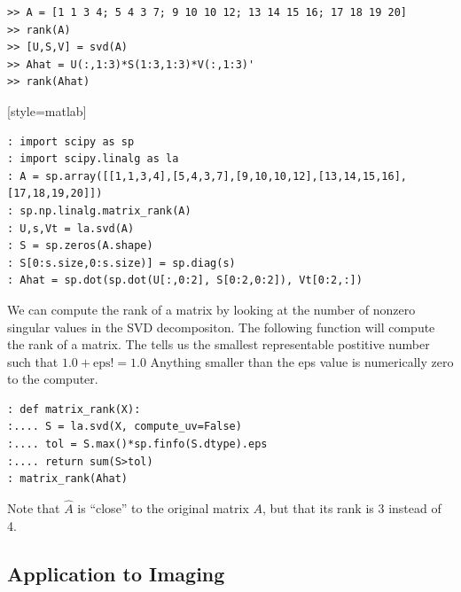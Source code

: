 \begin{matlab}
 \begin{lstlisting}[style=matlab]
>> A = [1 1 3 4; 5 4 3 7; 9 10 10 12; 13 14 15 16; 17 18 19 20]
>> rank(A)
>> [U,S,V] = svd(A)
>> Ahat = U(:,1:3)*S(1:3,1:3)*V(:,1:3)'
>> rank(Ahat)
\end{lstlisting}[style=matlab]
\end{matlab}
\begin{python}
\begin{lstlisting}[style=python]
: import scipy as sp
: import scipy.linalg as la
: A = sp.array([[1,1,3,4],[5,4,3,7],[9,10,10,12],[13,14,15,16],[17,18,19,20]])
: sp.np.linalg.matrix_rank(A)
: U,s,Vt = la.svd(A)
: S = sp.zeros(A.shape)
: S[0:s.size,0:s.size)] = sp.diag(s)
: Ahat = sp.dot(sp.dot(U[:,0:2], S[0:2,0:2]), Vt[0:2,:])
\end{lstlisting}

We can compute the rank of a matrix by looking at the number of nonzero singular values in the SVD decompositon.  The following function will compute the rank of a matrix.  The  tells us the smallest representable postitive number such that $1.0+\mbox{eps} != 1.0$  Anything smaller than the eps value is numerically zero to the computer.
\begin{lstlisting}[style=python]
: def matrix_rank(X):
:.... S = la.svd(X, compute_uv=False)
:.... tol = S.max()*sp.finfo(S.dtype).eps
:.... return sum(S>tol)
: matrix_rank(Ahat)
\end{lstlisting}
\end{python}
Note that $\widehat A$ is ``close'' to the original matrix $A$, but
that its rank is 3 instead of 4.

\subsection{Application to Imaging}

